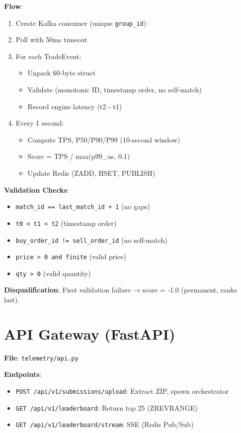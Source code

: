 \documentclass[10pt,a4paper,oneside]{report}
\begin{document}
\textbf{Flow}:
\begin{enumerate}
    \item Create Kafka consumer (unique \texttt{group\_id})
    \item Poll with 50ms timeout
    \item For each TradeEvent:
    \begin{itemize}
        \item Unpack 60-byte struct
        \item Validate (monotonic ID, timestamp order, no self-match)
        \item Record engine latency (t2 - t1)
    \end{itemize}
    \item Every 1 second:
    \begin{itemize}
        \item Compute TPS, P50/P90/P99 (10-second window)
        \item Score = TPS / max(p99\_us, 0.1)
        \item Update Redis (ZADD, HSET, PUBLISH)
    \end{itemize}
\end{enumerate}

\textbf{Validation Checks}:
\begin{itemize}
    \item \texttt{match\_id == last\_match\_id + 1} (no gaps)
    \item \texttt{t0 < t1 < t2} (timestamp order)
    \item \texttt{buy\_order\_id != sell\_order\_id} (no self-match)
    \item \texttt{price > 0 and finite} (valid price)
    \item \texttt{qty > 0} (valid quantity)
\end{itemize}

\textbf{Disqualification}: First validation failure → score = -1.0 (permanent, ranks last).

\section{API Gateway (FastAPI)}

\textbf{File}: \texttt{telemetry/api.py}

\textbf{Endpoints}:
\begin{itemize}
    \item \texttt{POST /api/v1/submissions/upload}: Extract ZIP, spawn orchestrator
    \item \texttt{GET /api/v1/leaderboard}: Return top 25 (ZREVRANGE)
    \item \texttt{GET /api/v1/leaderboard/stream}: SSE (Redis Pub/Sub)
\end{itemize}
\end{document}

